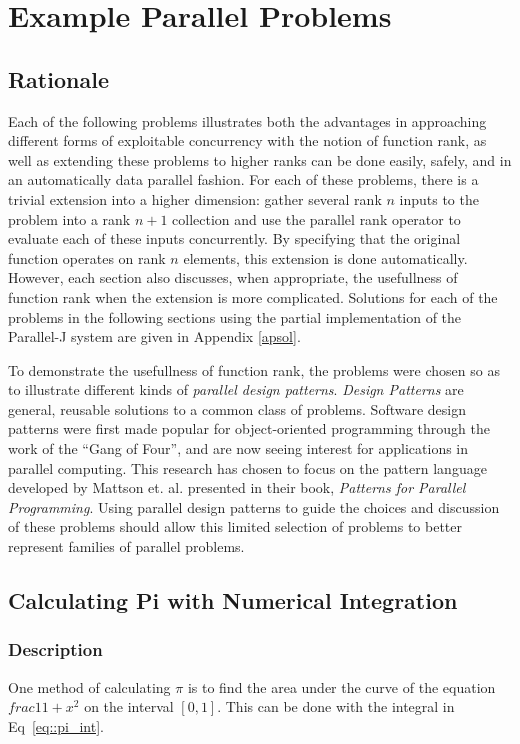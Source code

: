 \chapter{Example Parallel Problems}
\label{probs}

\section{Rationale}
Each of the following problems illustrates 
both the advantages in approaching different forms of exploitable concurrency with the notion of function rank, 
as well as extending these problems to higher ranks can be done easily, safely, and in an automatically data parallel fashion.
For each of these problems, there is a trivial extension into a higher dimension: 
gather several rank $n$ inputs to the problem into a rank $n+1$ collection 
and use the parallel rank operator to evaluate each of these inputs concurrently.
By specifying that the original function operates on rank $n$ elements, 
this extension is done automatically. 
However, each section also discusses, when appropriate, 
the usefullness of function rank when the extension is more complicated.
Solutions for each of the problems in the following sections using the partial implementation of the Parallel-J system
are given in Appendix \ref{apsol}.

To demonstrate the usefullness of function rank, 
the problems were chosen so as to illustrate different kinds of \textit{parallel design patterns}. 
\textit{Design Patterns} are general, reusable solutions to a common class of problems. %
Software design patterns were first made popular for object-oriented programming through 
the work of the ``Gang of Four''\cite{designp},
and are now seeing interest for applications in parallel computing\cite{mass}.
This research has chosen to focus on the pattern language developed by Mattson et. al. 
presented in their book, \textit{Patterns for Parallel Programming}\cite{mass}. %
Using parallel design patterns to guide the choices and discussion of these problems 
should allow this limited selection of problems to better represent families of parallel problems.

\section{Calculating Pi with Numerical Integration}
\subsection{Description}
One method of calculating $\pi$ is to find the area under 
the curve of the equation $frac{1}{1+x^2}$ on the interval $[0,1]$.
This can be done with the integral in Eq~\ref{eq::pi_int}.

